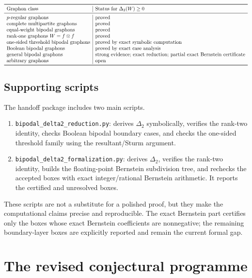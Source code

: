 \documentclass[11pt]{article}
\theoremstyle{definition}
\begin{document}
\[
\begin{array}{l|l}
\toprule
\text{Graphon class} & \text{Status for }\Delta_2(W)\ge0\\
\midrule
p\text{-regular graphons} & \text{proved}\\
\text{complete multipartite graphons} & \text{proved}\\
\text{equal-weight bipodal graphons} & \text{proved}\\
\text{rank-one graphons }W=f\otimes f & \text{proved}\\
\text{one-sided threshold bipodal graphons} & \text{proved by exact symbolic computation}\\
\text{Boolean bipodal graphons} & \text{proved by exact case analysis}\\
\text{general bipodal graphons} & \text{strong evidence; exact reduction; partial exact Bernstein certificate}\\
\text{arbitrary graphons} & \text{open}\\
\bottomrule
\end{array}
\]

\subsection{Supporting scripts}

The handoff package includes two main scripts.
\begin{enumerate}[label=(\roman*)]
\item \texttt{bipodal\_delta2\_reduction.py}: derives $\Delta_2$ symbolically, verifies the rank-two identity, checks Boolean bipodal boundary cases, and checks the one-sided threshold family using the resultant/Sturm argument.
\item \texttt{bipodal\_delta2\_formalization.py}: derives $\Delta_2$, verifies the rank-two identity, builds the floating-point Bernstein subdivision tree, and rechecks the accepted boxes with exact integer/rational Bernstein arithmetic.  It reports the certified and unresolved boxes.
\end{enumerate}
These scripts are not a substitute for a polished proof, but they make the computational claims precise and reproducible.  The exact Bernstein part certifies only the boxes whose exact Bernstein coefficients are nonnegative; the remaining boundary-layer boxes are explicitly reported and remain the current formal gap.


\section{The revised conjectural programme}
\end{document}
